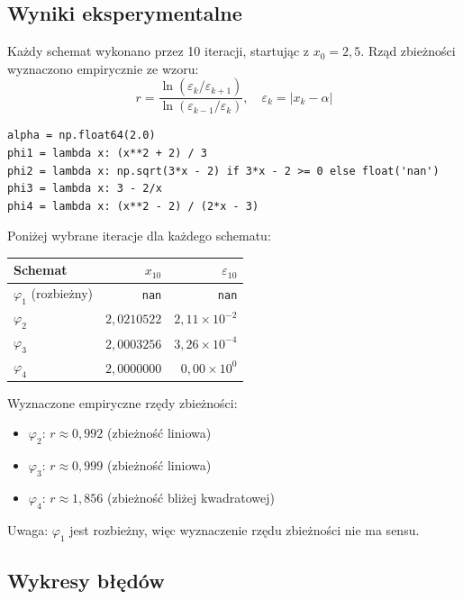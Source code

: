\documentclass[12pt, a4paper]{article}
\begin{document}
\subsection{Wyniki eksperymentalne}

Każdy schemat wykonano przez 10 iteracji, startując z $x_0 = 2{,}5$. Rząd zbieżności wyznaczono empirycznie ze wzoru:
\[
  r = \frac{\ln(\varepsilon_k / \varepsilon_{k+1})}{\ln(\varepsilon_{k-1} / \varepsilon_k)}, \quad \varepsilon_k = |x_k - \alpha|
\]

\begin{lstlisting}[caption={Implementacja schematów iteracyjnych}]
alpha = np.float64(2.0)
phi1 = lambda x: (x**2 + 2) / 3
phi2 = lambda x: np.sqrt(3*x - 2) if 3*x - 2 >= 0 else float('nan')
phi3 = lambda x: 3 - 2/x
phi4 = lambda x: (x**2 - 2) / (2*x - 3)
\end{lstlisting}

Poniżej wybrane iteracje dla każdego schematu:

\begin{center}
\begin{tabular}{l|r|r}
\toprule
Schemat & $x_{10}$ & $\varepsilon_{10}$ \\
\midrule
$\varphi_1$ (rozbieżny) & \texttt{nan} & \texttt{nan} \\
$\varphi_2$ & $2{,}0210522$ & $2{,}11 \times 10^{-2}$ \\
$\varphi_3$ & $2{,}0003256$ & $3{,}26 \times 10^{-4}$ \\
$\varphi_4$ & $2{,}0000000$ & $0{,}00 \times 10^{0}$ \\
\bottomrule
\end{tabular}
\end{center}

Wyznaczone empiryczne rzędy zbieżności:
\begin{itemize}
  \item $\varphi_2$: $r \approx 0{,}992$ (zbieżność liniowa)
  \item $\varphi_3$: $r \approx 0{,}999$ (zbieżność liniowa)
  \item $\varphi_4$: $r \approx 1{,}856$ (zbieżność bliżej kwadratowej)
\end{itemize}

Uwaga: $\varphi_1$ jest rozbieżny, więc wyznaczenie rzędu zbieżności nie ma sensu.

\subsection{Wykresy błędów}
\end{document}
